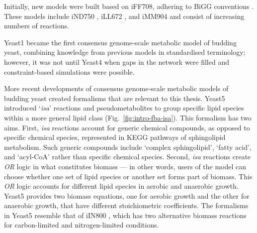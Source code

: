 Initially, new models were built based on iFF708, adhering to BiGG conventions \parencite{norsigianBiGGModels20202020}.
These models include iND750 \parencite{duarteReconstructionValidationSaccharomyces2004}, iLL672 \parencite{nookaewGenomescaleMetabolicModel2008}, and iMM904 \parencite{moConnectingExtracellularMetabolomic2009} and consist of increasing numbers of reactions.

Yeast1 \parencite{herrgardConsensusYeastMetabolic2008} became the first consensus genome-scale metabolic model of budding yeast, combining knowledge from previous models in standardised terminology; however, it was not until Yeast4 \parencite{dobsonFurtherDevelopmentsGenomescale2010} when gaps in the network were filled and constraint-based simulations were possible.

More recent developments of consensus genome-scale metabolic models of budding yeast created formalisms that are relevant to this thesis.
Yeast5 \parencite{heavnerYeastExpandedReconstruction2012} introduced `\textit{isa}' reactions and pseudometabolites to group specific lipid species within a more general lipid class (Fig.\ \ref{fig:intro-fba-isa}).
This formalism has two aims.
First, \textit{isa} reactions account for generic chemical compounds, as opposed to specific chemical species, represented in KEGG pathways of sphingolipid metabolism.
Such generic compounds include `complex sphingolipid', `fatty acid', and `acyl-CoA' rather than specific chemical species.
Second, \textit{isa} reactions create \textit{OR} logic in what constitutes biomass --- in other words, users of the model can choose whether one set of lipid species or another set forms part of biomass.
This \textit{OR} logic accounts for different lipid species in aerobic and anaerobic growth.
Yeast5 provides two biomass equations, one for aerobic growth and the other for anaerobic growth, that have different stoichiometric coefficients.
The formalisms in Yeast5 resemble that of iIN800 \parencite{nookaewGenomescaleMetabolicModel2008}, which has two alternative biomass reactions for carbon-limited and nitrogen-limited conditions.

